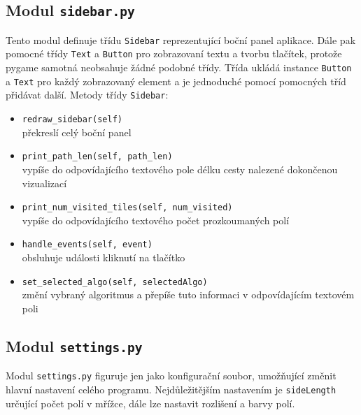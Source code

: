 \documentclass[12pt]{report}			%
\begin{document}
			\subsection{Modul \texttt{sidebar.py}}
			Tento modul definuje třídu \texttt{Sidebar} reprezentující boční panel aplikace. Dále pak pomocné třídy \texttt{Text} a \texttt{Button} pro zobrazovaní textu a tvorbu tlačítek, protože pygame samotná neobsahuje žádné podobné třídy. Třída ukládá instance \texttt{Button} a \texttt{Text} pro každý zobrazovaný element a je jednoduché pomocí pomocných tříd přidávat další.
			Metody třídy \texttt{Sidebar}:
			
			\begin{itemize}
			\setlength\itemsep{0.01mm}
			\item \texttt{redraw\_sidebar(self)}\\
			překreslí celý boční panel
			\item \texttt{print\_path\_len(self, path\_len)}\\
			vypíše do odpovídajícího textového pole délku cesty nalezené dokončenou vizualizací
			\item \texttt{print\_num\_visited\_tiles(self, num\_visited)}\\
			vypíše do odpovídajícího textového počet prozkoumaných polí
			\item \texttt{handle\_events(self, event)}\\
			obsluhuje události kliknutí na tlačítko
			\item \texttt{set\_selected\_algo(self, selectedAlgo)}\\
			změní vybraný algoritmus a přepíše tuto informaci v odpovídajícím textovém poli
			\end{itemize}
			
			
			
			\subsection{Modul \texttt{settings.py}}
			Modul \texttt{settings.py} figuruje jen jako konfigurační soubor, umožňující změnit hlavní nastavení celého programu. Nejdůležitějším nastavením je \texttt{sideLength} určující počet polí v mřížce, dále lze nastavit rozlišení a barvy polí.
			
\end{document}
